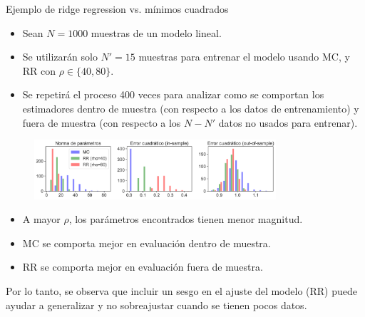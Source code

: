 \documentclass[handout, 9pt]{beamer}
\begin{document}
\begin{frame}{Ejemplo de ridge regression vs. mínimos cuadrados}

\begin{itemize}
	\item Sean $N=1000$ muestras de un modelo lineal.\pause
	\item Se utilizarán solo $N'=15$ muestras para entrenar el modelo usando MC, y RR con $\rho\in\{40,80\}$.\pause
	\item Se repetirá el proceso 400 veces para analizar como se comportan los estimadores dentro de muestra (con respecto a los datos de entrenamiento) y fuera de muestra (con respecto a los $N-N'$ datos no usados para entrenar).\pause
\end{itemize}
	
\begin{figure}[H]
	\centering
	\includegraphics[width=0.8\textwidth]{../img/cap2_bias-variance.pdf}\\
	\label{fig:MCvsRR_Synth}  
\end{figure}\pause

\begin{itemize}
	\item A mayor $\rho$, los parámetros encontrados tienen menor magnitud.\pause
	\item MC se comporta mejor en evaluación dentro de muestra.\pause
	\item RR se comporta mejor en evaluación fuera de muestra.\pause
\end{itemize}

Por lo tanto, se observa que incluir un sesgo en el ajuste del modelo (RR) puede ayudar a generalizar y no sobreajustar cuando se tienen pocos datos. 
		
\end{frame}
\end{document}

